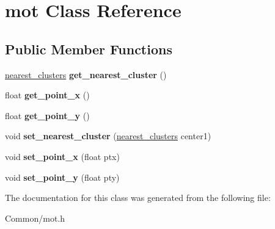 \hypertarget{classmot}{
\section{mot Class Reference}
\label{classmot}
}
\subsection*{Public Member Functions}
\begin{DoxyCompactItemize}
\item 
\hypertarget{classmot_a0aee7e386a7685ac08ea28b20d5b744b}{
\hyperlink{classnearest__clusters}{nearest\_\-clusters} {\bfseries get\_\-nearest\_\-cluster} ()}
\label{classmot_a0aee7e386a7685ac08ea28b20d5b744b}

\item 
\hypertarget{classmot_ae84804bd53d2742186f40c41aff6b43f}{
float {\bfseries get\_\-point\_\-x} ()}
\label{classmot_ae84804bd53d2742186f40c41aff6b43f}

\item 
\hypertarget{classmot_a55d264d0693e5dfb2fe37f585e311200}{
float {\bfseries get\_\-point\_\-y} ()}
\label{classmot_a55d264d0693e5dfb2fe37f585e311200}

\item 
\hypertarget{classmot_a7af2e2e8ed9a025fdcb3763bf99b4ead}{
void {\bfseries set\_\-nearest\_\-cluster} (\hyperlink{classnearest__clusters}{nearest\_\-clusters} center1)}
\label{classmot_a7af2e2e8ed9a025fdcb3763bf99b4ead}

\item 
\hypertarget{classmot_ad2cfada5759efda30c294f1c3709a60d}{
void {\bfseries set\_\-point\_\-x} (float ptx)}
\label{classmot_ad2cfada5759efda30c294f1c3709a60d}

\item 
\hypertarget{classmot_a0e0294791bdfb00e0fb93b928978a1b3}{
void {\bfseries set\_\-point\_\-y} (float pty)}
\label{classmot_a0e0294791bdfb00e0fb93b928978a1b3}

\end{DoxyCompactItemize}


The documentation for this class was generated from the following file:\begin{DoxyCompactItemize}
\item 
Common/mot.h\end{DoxyCompactItemize}

